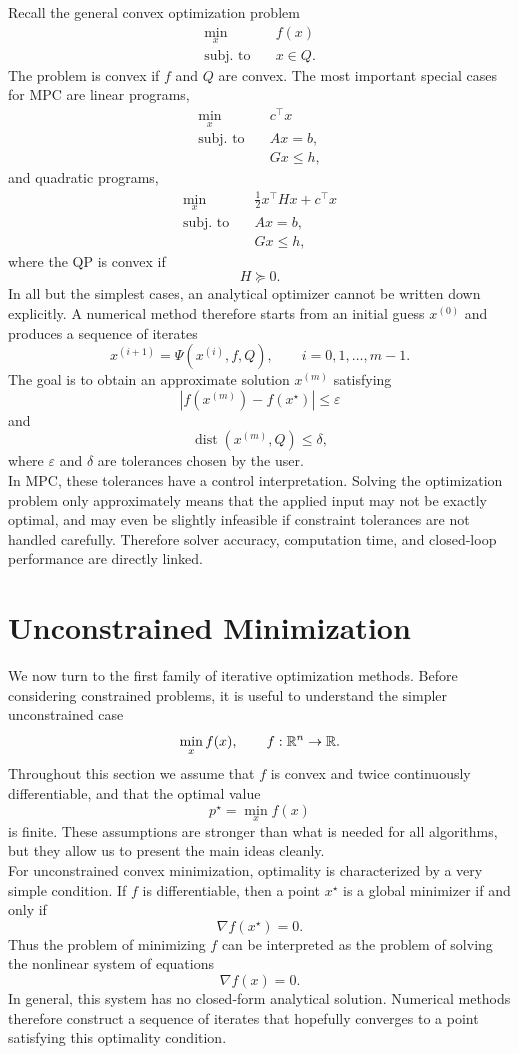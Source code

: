 Recall the general convex optimization problem
\[
\begin{aligned}
    \min_x \quad & f(x)\\
    \text{subj. to}\quad & x\in Q.
\end{aligned}
\]
The problem is convex if \(f\) and \(Q\) are convex. The most important special cases for MPC
are linear programs,
\[
\begin{aligned}
    \min_x \quad & c^\top x\\
    \text{subj. to}\quad & Ax=b,\\
    & Gx\leq h,
\end{aligned}
\]
and quadratic programs,
\[
\begin{aligned}
    \min_x \quad & \frac{1}{2}x^\top Hx+c^\top x\\
    \text{subj. to}\quad & Ax=b,\\
    & Gx\leq h,
\end{aligned}
\]
where the QP is convex if
\[
    H\succeq 0.
\]
In all but the simplest cases, an analytical optimizer cannot be written down explicitly. A
numerical method therefore starts from an initial guess \(x^{(0)}\) and produces a sequence of
iterates
\[
    x^{(i+1)}
    =
    \Psi(x^{(i)},f,Q),
    \qquad i=0,1,\ldots,m-1.
\]
The goal is to obtain an approximate solution \(x^{(m)}\) satisfying
\[
    |f(x^{(m)})-f(x^\star)|\leq \varepsilon
\]
and
\[
    \operatorname{dist}(x^{(m)},Q)\leq \delta,
\]
where \(\varepsilon\) and \(\delta\) are tolerances chosen by the user.\\
In MPC, these tolerances have a control interpretation. Solving the optimization problem only
approximately means that the applied input may not be exactly optimal, and may even be slightly
infeasible if constraint tolerances are not handled carefully. Therefore solver accuracy,
computation time, and closed-loop performance are directly linked.

\section{Unconstrained Minimization}

We now turn to the first family of iterative optimization methods. Before considering constrained
problems, it is useful to understand the simpler unconstrained case
\[
    \min_x f(x),
    \qquad
    f:\mathbb{R}^n\to\mathbb{R}.
\]
Throughout this section we assume that \(f\) is convex and twice continuously differentiable,
and that the optimal value
\[
    p^\star=\min_x f(x)
\]
is finite. These assumptions are stronger than what is needed for all algorithms, but they allow
us to present the main ideas cleanly.\\
For unconstrained convex minimization, optimality is characterized by a very simple condition.
If \(f\) is differentiable, then a point \(x^\star\) is a global minimizer if and only if
\[
    \nabla f(x^\star)=0.
\]
Thus the problem of minimizing \(f\) can be interpreted as the problem of solving the nonlinear
system of equations
\[
    \nabla f(x)=0.
\]
In general, this system has no closed-form analytical solution. Numerical methods therefore
construct a sequence of iterates that hopefully converges to a point satisfying this optimality
condition.

